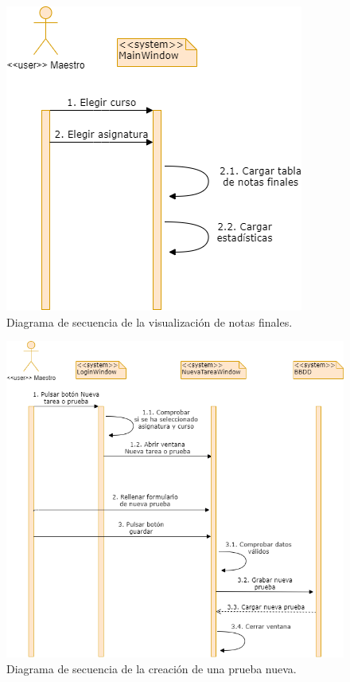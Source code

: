 \begin{figure}[h]
\centering\includegraphics[width=1\linewidth]{figs/dia_mainwindow.png}
\caption{Diagrama de secuencia de la visualización de notas finales.}
\label{Fig:dia_mainwindow}
\end{figure}

\begin{figure}[h]
\centering\includegraphics[width=1\linewidth]{figs/dia_nuevaprueba.png}
\caption{Diagrama de secuencia de la creación de una prueba nueva.}
\label{Fig:dia_nuevaprueba}
\end{figure}

